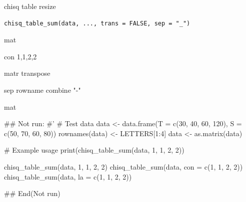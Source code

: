 \documentclass[a4paper]{book}
\begin{document}
%
\begin{Description}
chisq table resize
\end{Description}
%
\begin{Usage}
\begin{verbatim}
chisq_table_sum(data, ..., trans = FALSE, sep = "_")
\end{verbatim}
\end{Usage}
%
\begin{Arguments}
\begin{ldescription}
\item[\code{data}] mat

\item[\code{...}] con 1,1,2,2

\item[\code{trans}] matr transpose

\item[\code{sep}] sep rowname combine  "-"
\end{ldescription}
\end{Arguments}
%
\begin{Value}
mat
\end{Value}
%
\begin{Examples}
\begin{ExampleCode}

\#\# Not run: 
#'
# Test data
data <- data.frame(T = c(30, 40, 60, 120),
                   S = c(50, 70, 60, 80))
rownames(data) <- LETTERS[1:4]
data <- as.matrix(data)

# Example usage
print(chisq_table_sum(data, 1, 1, 2, 2))

chisq_table_sum(data, 1, 1, 2, 2)
chisq_table_sum(data, con = c(1, 1, 2, 2))
chisq_table_sum(data, la = c(1, 1, 2, 2))


## End(Not run)



\end{ExampleCode}
\end{Examples}
\end{document}
